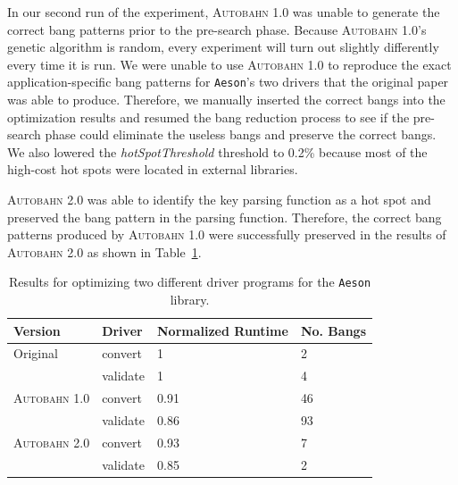 \documentclass[format=sigplan, review=true]{acmart}
\newcommand{\tblref}[1]{Table~\ref{#1}}
\newcommand{\hotspot}[0]{hot spot}
\newcommand{\hotspots}[0]{hot spots}
\newcommand{\hotspotcost}[0]{\textit{hotSpotThreshold}}
\newcommand{\Ao}[0]{\textsc{Autobahn 1.0}}
\newcommand{\At}[0]{\textsc{Autobahn 2.0}}
\newcommand{\preopt}[0]{pre-search}
\begin{document}


In our second run of the experiment, \Ao{} was unable to generate the correct bang patterns prior to the \preopt{} phase. Because \Ao{}'s genetic algorithm is random, every experiment will turn out slightly differently every time it is run. We were unable to use \Ao{} to reproduce the exact application-specific bang patterns for \texttt{Aeson}'s two drivers that the original paper was able to produce. Therefore, we manually inserted the correct bangs into the optimization results and resumed the bang reduction process to see if the \preopt{} phase could eliminate the useless bangs and preserve the correct bangs. We also lowered the \hotspotcost{} threshold to 0.2\% because most of the high-cost \hotspots{} were located in external libraries. 

\At{} was able to identify the key parsing function as a \hotspot{}
and preserved the bang pattern in the parsing function. Therefore, the
correct bang patterns produced by \Ao{} were successfully preserved in
the results of \At{} as shown in \tblref{tab:aeson}. 

\begin{table}
\begin{tabular}{p{2.5cm}p{1cm}p{1.5cm}p{1.5cm}}
\hline
Version   & Driver & Normalized Runtime & No. Bangs\\
\hline
Original      & convert   & 1     & 2 \\
          & validate        & 1     &  4\\
\Ao{}       & convert     & 0.91     & 46\\
          & validate        & 0.86	& 93\\
\At{}       & convert     & 0.93     &   7 \\
          & validate        & 0.85 & 2	\\
\hline
\end{tabular}
\caption{Results for optimizing two different driver programs for
the \texttt{Aeson} library.}
\label{tab:aeson}
\end{table}
\end{document}
